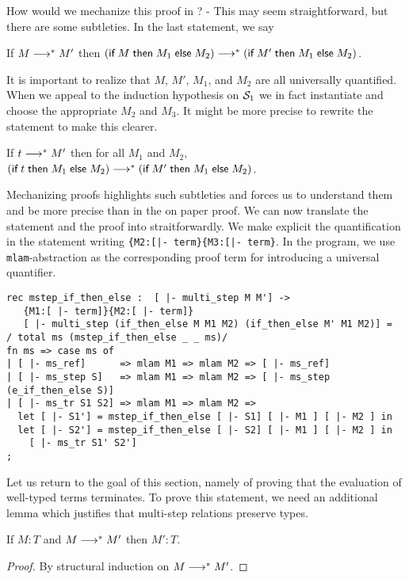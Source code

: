 How would we mechanize this proof in \beluga? - This may seem
straightforward, but there are some subtleties. In the last statement,
we say

\begin{center}
If $M \MSteps M'$ then $(\tmif M {M_1} {M_2}) \MSteps (\tmif {M'} {M_1} {M_2})$.
\end{center}

It is important to realize that $M$, $M'$, $M_1$, and $M_2$ are all
universally quantified.  When we appeal to the induction hypothesis on
$\S_1$ we in fact instantiate and choose the appropriate $M_2$ and
$M_3$. It might be more precise to rewrite the statement to make this clearer.

\begin{center}
If $t \MSteps M'$ then for all $M_1$ and $M_2$, $(\tmif t {M_1} {M_2}) \MSteps (\tmif {M'} {M_1} {M_2})$.
\end{center}

Mechanizing proofs highlights such subtleties and forces us to
understand them and be more precise than in the on paper proof. We can
now translate the statement and the proof into
\beluga straitforwardly. We make explicit the quantification in the
statement writing \lstinline!{M2:[|- term}{M3:[|- term}!. In the
program, we use \lstinline!mlam!-abstraction as the corresponding
proof term for introducing a universal quantifier.

\begin{lstlisting}
rec mstep_if_then_else :  [ |- multi_step M M'] ->
   {M1:[ |- term]}{M2:[ |- term]}
   [ |- multi_step (if_then_else M M1 M2) (if_then_else M' M1 M2)] =
/ total ms (mstep_if_then_else _ _ ms)/
fn ms => case ms of
| [ |- ms_ref]      => mlam M1 => mlam M2 => [ |- ms_ref]
| [ |- ms_step S]   => mlam M1 => mlam M2 => [ |- ms_step (e_if_then_else S)]
| [ |- ms_tr S1 S2] => mlam M1 => mlam M2 =>
  let [ |- S1'] = mstep_if_then_else [ |- S1] [ |- M1 ] [ |- M2 ] in
  let [ |- S2'] = mstep_if_then_else [ |- S2] [ |- M1 ] [ |- M2 ] in
    [ |- ms_tr S1' S2']
;
\end{lstlisting}


Let us return to the goal of this section, namely of proving that the
evaluation of well-typed terms terminates. To prove this statement, we
need an additional lemma which justifies that multi-step relations
preserve types.

\begin{lemma}
If $M : T$ and $M \MSteps M'$ then $M':T$.
\end{lemma}
\begin{proof}
By structural induction on $M \MSteps M'$.
\end{proof}

